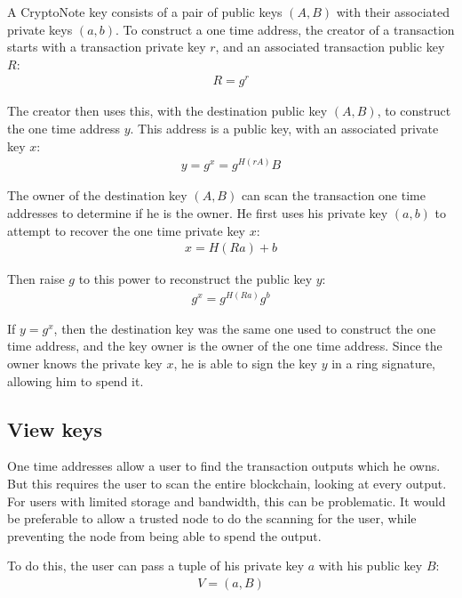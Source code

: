 \documentclass{article}
\begin{document}
A CryptoNote key consists of a pair of public keys $(A, B)$ with their associated private keys $(a, b)$.  To construct a one time address, the creator of a transaction starts with a transaction private key $r$, and an associated transaction public key $R$:
\begin{eqnarray}
  R=g^r
\end{eqnarray}

The creator then uses this, with the destination public key $(A, B)$, to construct the one time address $y$.  This address is a public key, with an associated private key $x$:
\begin{eqnarray}
  y = g^x = g^{H(rA)} B
\end{eqnarray}

The owner of the destination key $(A, B)$ can scan the transaction one time addresses to determine if he is the owner.  He first uses his private key $(a, b)$ to attempt to recover the one time private key $x$:
\begin{eqnarray}
	x = H(Ra) + b
\end{eqnarray}

Then raise $g$ to this power to reconstruct the public key $y$:
\begin{eqnarray}
  g^x = g^{H(Ra)} g^b
\end{eqnarray}

If $y = g^x$, then the destination key was the same one used to construct the one time address, and the key owner is the owner of the one time address.  Since the owner knows the private key $x$, he is able to sign the key $y$ in a ring signature, allowing him to spend it.


\subsection{View keys}

One time addresses allow a user to find the transaction outputs which he owns.  But this requires the user to scan the entire blockchain, looking at every output.  For users with limited storage and bandwidth, this can be problematic.  It would be preferable to allow a trusted node to do the scanning for the user, while preventing the node from being able to spend the output.

To do this, the user can pass a tuple of his private key $a$ with his public key $B$:
\begin{eqnarray}
  V = (a, B)
\end{eqnarray}
\end{document}
